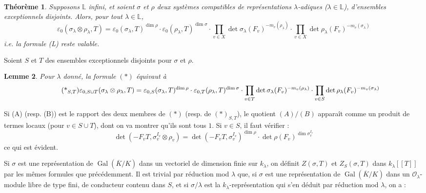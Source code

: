 \documentclass[11pt,a4paper]{article}
\theoremstyle{plain}
\newtheorem{theorem}{Th\'eor\`eme}
\newtheorem{lemma}[theorem]{Lemme}
\DeclareMathOperator{\Gal}{Gal}
\begin{document}
\begin{theorem}
Supposons $\mathbb{L}$ infini, et soient $\sigma$ et $\rho$ deux syst\`emes compatibles de repr\'esentations $\lambda$-adiques ($\lambda \in \mathbb{L}$), d'ensembles exceptionnels disjoints. Alors, pour tout $\lambda \in \mathbb{L}$,
\begin{equation}\tag{*}
\varepsilon_0(\sigma_\lambda \otimes \rho_\lambda, T) = \varepsilon_0(\sigma_\lambda, T)^{\dim \rho} \cdot \varepsilon_0(\rho_\lambda, T)^{\dim \sigma} \cdot \prod_{v \in X} \det \sigma_\lambda(F_v)^{-m_v(\rho_\lambda)} \cdot \prod_{v \in X} \det \rho_\lambda(F_v)^{-m_v(\sigma_\lambda)}
\end{equation}
i.e. la formule (L) reste valable.
\end{theorem}

\smallskip

Soient $S$ et $T$ des ensembles exceptionnels disjoints pour $\sigma$ et $\rho$.

\begin{lemma}
Pour $\lambda$ donn\'e, la formule $(*)$ \'equivaut \`a
\begin{equation}\tag{*$_{S,T}$}
\varepsilon_{0,S \cup T}(\sigma_\lambda \otimes \rho_\lambda, T) = \varepsilon_{0,S}(\sigma_\lambda, T)^{\dim \rho} \cdot \varepsilon_{0,T}(\rho_\lambda, T)^{\dim \sigma} \cdot \prod_{v \in T} \det \sigma_\lambda(F_v)^{-m_v(\rho_\lambda)} \cdot \prod_{v \in S} \det \rho_\lambda(F_v)^{-m_v(\sigma_\lambda)}
\end{equation}
\end{lemma}

Si (A) (resp. (B)) est le rapport des deux membres de $(*)$ (resp. de $(*)_{S,T}$), le quotient $(A)/(B)$ appara\^it comme un produit de termes locaux (pour $v \in S \cup T$), dont on va montrer qu'ils sont tous $1$. Si $v \in S$, il faut v\'erifier :
\[
\det(-F_v T, \sigma_v^{I_v} \otimes \rho_v) = \det(-F_v T, \sigma_v^{I_v})^{\dim \rho} \cdot \det \rho(F_v)^{\dim \sigma_v^{I_v}}
\]
ce qui est \'evident.

Si $\sigma$ est une repr\'esentation de $\Gal(\overline{K}/K)$ dans un vectoriel de dimension finie sur $k_\lambda$, on d\'efinit $Z(\sigma, T)$ et $Z_S(\sigma, T)$ dans $k_\lambda[[T]]$ par les m\^emes formules que pr\'ec\'edemment. Il est trivial par r\'eduction mod $\lambda$ que, si $\sigma$ est une repr\'esentation de $\Gal(\overline{K}/K)$ dans un $\mathcal{O}_\lambda$-module libre de type fini, de conducteur contenu dans $S$, et si $\sigma/\lambda$ est la $k_\lambda$-repr\'esentation qui s'en d\'eduit par r\'eduction mod $\lambda$, on a :
\end{document}
